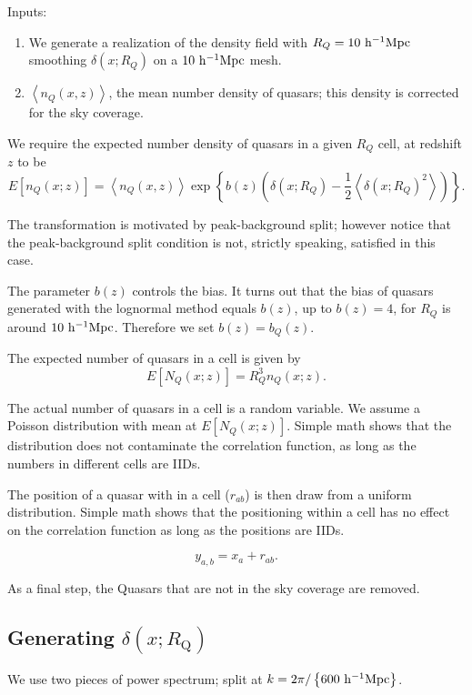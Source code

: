 \documentclass{paper}
\begin{document}
    Inputs:
    \begin{enumerate}
        \item 
            We generate a realization of the density field 
        with $R_Q = 10\,\mpch$ smoothing $\delta(x; R_Q)$ on
        a $10\,\mpch$ mesh. 
        \item $\left<n_Q(x, z)\right>$, 
            the mean number density of quasars; this density is
            corrected for the sky coverage.
    \end{enumerate}

    We require the expected number density of quasars in a given $R_Q$
    cell, at redshift $z$ to be
    \[
        E[n_Q(x; z)] = \left<n_Q(x, z)\right> 
        \exp \left\{b(z) \left( 
        \delta(x; R_Q) - \frac{1}{2}\left<\delta(x;
        R_Q)^2\right>
    \right)\right\}.
    \]


    The transformation is
    motivated by peak-background split; however notice that
    the peak-background split condition is not, strictly
    speaking, satisfied in this case.

    The parameter $b(z)$ controls the bias. It turns out that
    the bias of quasars generated with the lognormal method 
    equals $b(z)$, up to $b(z)=4$, for $R_Q$ is around $10\,\mpch$. 
    Therefore we set $b(z) = b_Q(z)$.

    The expected number of quasars in a cell is given by 
    \[
        E[N_Q(x; z)] = R_Q^3 n_Q(x; z).
    \]

    The actual number of quasars in a cell is a random
    variable. We assume a Poisson distribution with mean at
    $E[N_Q(x; z)]$. Simple math shows that the distribution 
    does not contaminate the correlation function, as long
    as the numbers in different cells are IIDs.

    The position of a quasar with in a cell ($r_{ab}$) is then draw from a
    uniform distribution. Simple math shows that the
    positioning within a cell has no effect on the
    correlation function as long as the positions are IIDs.

    \[
        y_{a, b} = x_a + r_{ab}.
    \]

    As a final step, the Quasars that are not in the sky coverage are
    removed.

\subsection{Generating $\delta(x; R_\mathrm{Q})$}
    We use two pieces of power spectrum; 
    split at $k = 2\pi / \left\{600\, \mpch \right\}$.
\end{document}
